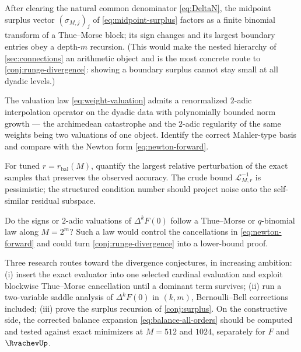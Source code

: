\documentclass[11pt,oneside]{article}
\numberwithin{equation}{section}
\theoremstyle{definition}
\theoremstyle{remark}
\newcommand{\Leb}{\mathscr L}
\begin{document}
\begin{conjecture}
\label{conj:surplus}
After clearing the natural common denominator
\eqref{eq:DeltaN}, the midpoint surplus vector
$(\sigma_{M,j})_j$ of \eqref{eq:midpoint-surplus} factors as a finite
binomial transform of a Thue--Morse block; its sign changes and its
largest boundary entries obey a depth-$m$ recursion.  (This would
make the nested hierarchy of \cref{sec:connections} an arithmetic
object and is the most concrete route to
\cref{conj:runge-divergence}: showing a boundary surplus cannot stay
small at all dyadic levels.)
\end{conjecture}

\begin{conjecture}
\label{conj:2adic-stability}
The valuation law \eqref{eq:weight-valuation} admits a renormalized
$2$-adic interpolation operator on the dyadic data with polynomially
bounded norm growth --- the archimedean catastrophe and the $2$-adic
regularity of the same weights being two valuations of one object.
Identify the correct Mahler-type basis and compare with the Newton
form \eqref{eq:newton-forward}.
\end{conjecture}

\begin{problem}
For tuned $r=r_{\mathrm{bal}}(M)$, quantify the largest relative
perturbation of the exact samples that preserves the observed
accuracy.  The crude bound $\Leb_{M,r}^{-1}$ is pessimistic; the
structured condition number should project noise onto the
self-similar residual subspace.
\end{problem}

\begin{question}
Do the signs or $2$-adic valuations of $\Delta^{k}F(0)$ follow a
Thue--Morse or $q$-binomial law along $M=2^{m}$?  Such a law would
control the cancellations in \eqref{eq:newton-forward} and could turn
\cref{conj:runge-divergence} into a lower-bound proof.
\end{question}

Three research routes toward the divergence conjectures, in
increasing ambition: (i) insert the exact evaluator into one selected
cardinal evaluation and exploit blockwise Thue--Morse cancellation
until a dominant term survives; (ii) run a two-variable saddle
analysis of $\Delta^{k}F(0)$ in $(k,m)$, Bernoulli--Bell corrections
included; (iii) prove the surplus recursion of
\cref{conj:surplus}.  On the constructive side, the corrected balance
expansion \eqref{eq:balance-all-orders} should be computed and tested
against exact minimizers at $M=512$ and $1024$, separately for $F$
and $\RvachevUp$.
\end{document}
